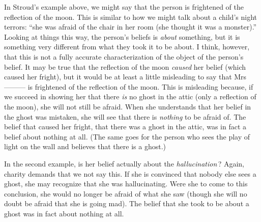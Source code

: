 \documentclass[11pt]{article}
\begin{document}
\begin{spacing}{1.5}
In Stroud's example above, we might say that the person is frightened of the reflection of the moon. This is similar to how we might talk about a child's night terrors: ``she was afraid of the chair in her room (she thought it was a monster).'' Looking at things this way, the person's beliefs is {\em about} something, but it is something very different from what they took it to be about. I think, however, that this is not a fully accurate characterization of the object of the person's belief. It may be true that the reflection of the moon {\em caused} her belief (which caused her fright), but it would be at least a little misleading to say that Mrs --------- is frightened of the reflection of the moon. This is misleading because, if we succeed in showing her that there {\em is} no ghost in the attic (only a reflection of the moon), she will not still be afraid. When she understands that her belief in the ghost was mistaken, she will see that there is {\em nothing} to be afraid of. The belief that caused her fright, that there was a ghost in the attic, was in fact a belief about nothing at all. (The same goes for the person who sees the play of light on the wall and believes that there is a ghost.)

In the second example, is her belief actually about the {\em hallucination}\,? Again, charity demands that we not say this. If she is convinced that nobody else sees a ghost, she may recognize that she was hallucinating. Were she to come to this conclusion, she would no longer be afraid of what she saw (though she will no doubt be afraid that she is going mad). The belief that she took to be about a ghost was in fact about nothing at all.


\end{spacing}
\end{document}
